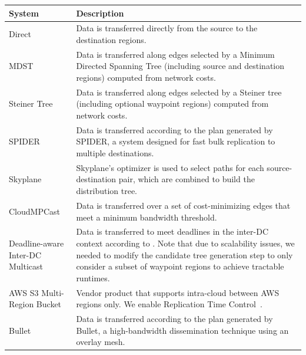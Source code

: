 \begin{table}[t!]
\centering
\footnotesize
\renewcommand{\arraystretch}{1.1}
\begin{tabularx}{\textwidth}{ l X }
\toprule
    \textbf{System} & \textbf{Description} \\
    \midrule
    Direct & Data is transferred directly from the source to the destination regions.  \\
    MDST & Data is transferred along edges selected by a Minimum Directed Spanning Tree (including source and destination regions) computed from network costs. \\
    Steiner Tree & Data is transferred along edges selected by a Steiner tree (including optional waypoint regions) computed from network costs. \\
    SPIDER~\cite{ganguly2005fast} & Data is transferred according to the plan generated by SPIDER, a system designed for fast bulk replication to multiple destinations.\\
    Skyplane & Skyplane's optimizer is used to select paths for each source-destination pair, which are combined to build the distribution tree.  \\
    CloudMPCast~\cite{garcia2015cost} & Data is transferred over a set of cost-minimizing edges that meet a minimum bandwidth threshold. \\
    \makecell[tl]{Deadline-aware\\ Inter-DC Multicast~\cite{deadline2018}} & Data is transferred to meet deadlines in the inter-DC context according to \cite{deadline2018}. Note that due to scalability issues, we needed to modify the candidate tree generation step to only consider a subset of waypoint regions to achieve tractable runtimes. \\
    \makecell[tl]{AWS S3 Multi-\\Region Bucket~\cite{aws-replication}} & Vendor product that supports intra-cloud between AWS regions only. We enable Replication Time Control~\cite{aws-replication-time-control}.\\
    Bullet~\cite{kostic2003bullet} &  Data is transferred according to the plan generated by Bullet, a high-bandwidth dissemination technique using an overlay mesh.\\

\end{tabularx}
\end{table}
